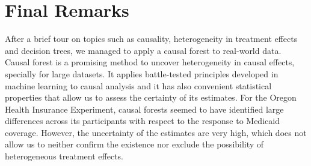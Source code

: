 \section{Final Remarks}

After a brief tour on topics such as causality, heterogeneity in treatment effects and decision trees, we managed to apply a causal forest to real-world data. Causal forest is a promising method to uncover heterogeneity in causal effects, specially for large datasets. It applies battle-tested principles developed in machine learning to causal analysis and it has also convenient statistical properties that allow us to assess the certainty of its estimates. For the Oregon Health Insurance Experiment, causal forests seemed to have identified large differences across its participants with respect to the response to Medicaid coverage. However, the uncertainty of the estimates are very high, which does not allow us to neither confirm the existence nor exclude the possibility of heterogeneous treatment effects.

